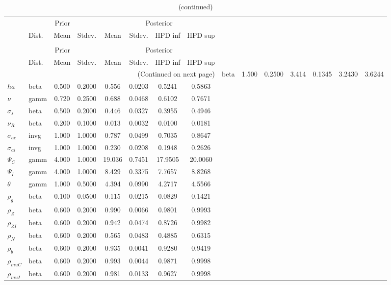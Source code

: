  
\begin{center}
\begin{longtable}{llcccccc} 
\caption{Results from Metropolis-Hastings (parameters)}
 \label{Table:MHPosterior:1}\\
\toprule 
  & \multicolumn{3}{c}{Prior}  &  \multicolumn{4}{c}{Posterior} \\
  \cmidrule(r{.75em}){2-4} \cmidrule(r{.75em}){5-8}
  & Dist. & Mean  & Stdev. & Mean & Stdev. & HPD inf & HPD sup\\
\midrule \endfirsthead 
\caption{(continued)}\\\toprule 
  & \multicolumn{3}{c}{Prior}  &  \multicolumn{4}{c}{Posterior} \\
  \cmidrule(r{.75em}){2-4} \cmidrule(r{.75em}){5-8}
  & Dist. & Mean  & Stdev. & Mean & Stdev. & HPD inf & HPD sup\\
\midrule \endhead 
\bottomrule \multicolumn{8}{r}{(Continued on next page)} \endfoot 
\bottomrule \endlastfoot 
${\gamma}$ & beta &   1.500 & 0.2500 &   3.414& 0.1345 &  3.2430 &  3.6244 \\ 
${ha}$ & beta &   0.500 & 0.2000 &   0.556& 0.0203 &  0.5241 &  0.5863 \\ 
$\nu$ & gamm &   0.720 & 0.2500 &   0.688& 0.0468 &  0.6102 &  0.7671 \\ 
$\sigma_s$ & beta &   0.500 & 0.2000 &   0.446& 0.0327 &  0.3955 &  0.4946 \\ 
${\nu_R}$ & beta &   0.200 & 0.1000 &   0.013& 0.0032 &  0.0100 &  0.0181 \\ 
${\sigma_{ac}}$ & invg &   1.000 & 1.0000 &   0.787& 0.0499 &  0.7035 &  0.8647 \\ 
${\sigma_{ai}}$ & invg &   1.000 & 1.0000 &   0.230& 0.0208 &  0.1948 &  0.2626 \\ 
${\Psi_C}$ & gamm &   4.000 & 1.0000 &  19.036& 0.7451 & 17.9505 & 20.0060 \\ 
${\Psi_I}$ & gamm &   4.000 & 1.0000 &   8.429& 0.3375 &  7.7657 &  8.8268 \\ 
${\theta}$ & gamm &   1.000 & 0.5000 &   4.394& 0.0990 &  4.2717 &  4.5566 \\ 
${\rho_g}$ & beta &   0.100 & 0.0500 &   0.115& 0.0215 &  0.0829 &  0.1421 \\ 
${\rho_Z}$ & beta &   0.600 & 0.2000 &   0.990& 0.0066 &  0.9801 &  0.9993 \\ 
${\rho_{ZI}}$ & beta &   0.600 & 0.2000 &   0.942& 0.0474 &  0.8726 &  0.9982 \\ 
${\rho_N}$ & beta &   0.600 & 0.2000 &   0.565& 0.0483 &  0.4885 &  0.6315 \\ 
${\rho_b}$ & beta &   0.600 & 0.2000 &   0.935& 0.0041 &  0.9280 &  0.9419 \\ 
${\rho_{muC}}$ & beta &   0.600 & 0.2000 &   0.993& 0.0044 &  0.9871 &  0.9998 \\ 
${\rho_{muI}}$ & beta &   0.600 & 0.2000 &   0.981& 0.0133 &  0.9627 &  0.9998 \\ 
\end{longtable}
 \end{center}
